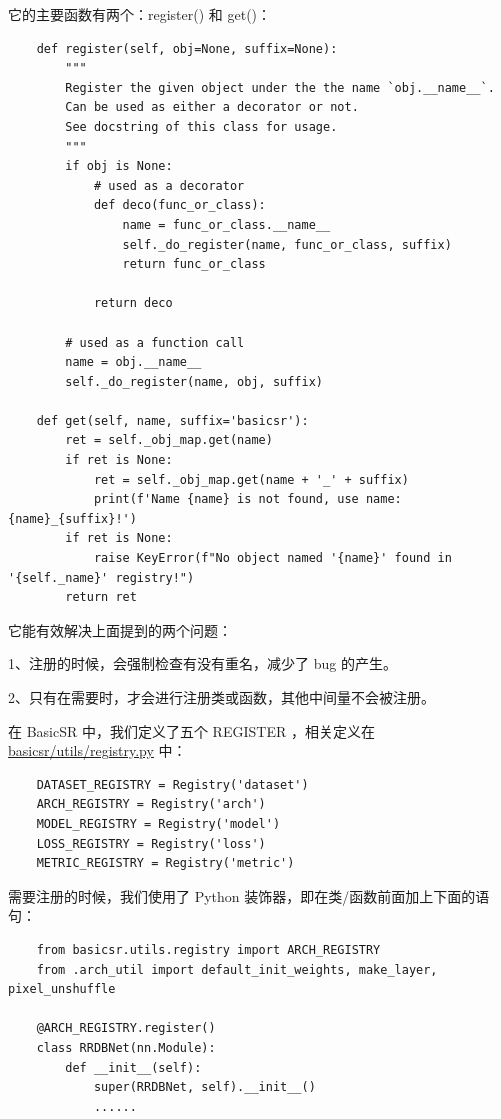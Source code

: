 \documentclass[../main.tex]{subfiles}
\begin{document}
	它的主要函数有两个：register() 和 get()：
	\begin{verbatim}
    def register(self, obj=None, suffix=None):
        """
        Register the given object under the the name `obj.__name__`.
        Can be used as either a decorator or not.
        See docstring of this class for usage.
        """
        if obj is None:
            # used as a decorator
            def deco(func_or_class):
                name = func_or_class.__name__
                self._do_register(name, func_or_class, suffix)
                return func_or_class

            return deco

        # used as a function call
        name = obj.__name__
        self._do_register(name, obj, suffix)

    def get(self, name, suffix='basicsr'):
        ret = self._obj_map.get(name)
        if ret is None:
            ret = self._obj_map.get(name + '_' + suffix)
            print(f'Name {name} is not found, use name: {name}_{suffix}!')
        if ret is None:
            raise KeyError(f"No object named '{name}' found in '{self._name}' registry!")
        return ret
	\end{verbatim}
	
    它能有效解决上面提到的两个问题：

    1、注册的时候，会强制检查有没有重名，减少了 bug 的产生。

    2、只有在需要时，才会进行注册类或函数，其他中间量不会被注册。

    在 BasicSR 中，我们定义了五个 REGISTER ，相关定义在 \href{https://github.com/XPixelGroup/BasicSR/blob/master/basicsr/utils/registry.py}{basicsr/utils/registry.py} 中：
    \begin{verbatim}
    DATASET_REGISTRY = Registry('dataset')
    ARCH_REGISTRY = Registry('arch')
    MODEL_REGISTRY = Registry('model')
    LOSS_REGISTRY = Registry('loss')
    METRIC_REGISTRY = Registry('metric')
	\end{verbatim}
	
	需要注册的时候，我们使用了 Python 装饰器，即在类/函数前面加上下面的语句：
	\begin{verbatim}
    from basicsr.utils.registry import ARCH_REGISTRY
    from .arch_util import default_init_weights, make_layer, pixel_unshuffle
    
    @ARCH_REGISTRY.register()
    class RRDBNet(nn.Module):
        def __init__(self):
            super(RRDBNet, self).__init__()
            ......
	\end{verbatim}
	
\end{document}
